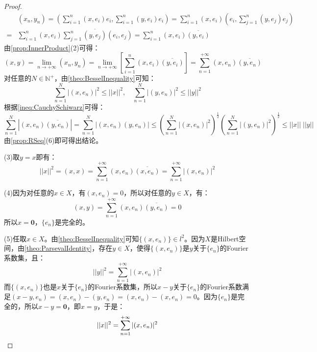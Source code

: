 \begin{proof}
	\begin{align*}
		&(x_n,y_n)=\left(\sum_{i=1}^{n}(x,e_i)e_i,\sum_{i=1}^{n}(y,e_i)e_i\right)=\sum_{i=1}^{n}(x,e_i)\left(e_i,\sum_{j=1}^{n}(y,e_j)e_j\right) \\
		=&\sum_{i=1}^{n}(x,e_i)\sum_{j=1}^{n}\overline{(y,e_j)}(e_i,e_j) =\sum_{i=1}^{n}(x,e_i)\overline{(y,e_i)}
	\end{align*}
	由\cref{prop:InnerProduct}(2)可得：
	\begin{equation*}
		(x,y)=\lim_{n\to+\infty}(x_n,y_n)=\lim_{n\to+\infty}\left[\sum_{i=1}^{n}(x,e_i)\overline{(y,e_i)}\right]=\sum_{n=1}^{+\infty}(x,e_n)\overline{(y,e_n)}
	\end{equation*}
	对任意的$N\in\mathbb{N}^+$，由\cref{theo:BesselInequality}可知：
	\begin{equation*}
		\sum_{n=1}^{N}|(x,e_n)|^2\leqslant||x||^2,\quad\sum_{n=1}^{N}|(y,e_n)|^2\leqslant||y||^2
	\end{equation*}
	根据\cref{ineq:CauchySchiwarz}可得：
	\begin{equation*}
		\sum_{n=1}^{N}|(x,e_n)\overline{(y,e_n)}|=\sum_{n=1}^{N}|(x,e_n)(y,e_n)|\leqslant\left(\sum_{n=1}^{N}|(x,e_n)|^2\right)^{\frac{1}{2}}\left(\sum_{n=1}^{N}|(y,e_n)|^2\right)^{\frac{1}{2}}\leqslant||x||\;||y||
	\end{equation*}
	由\cref{prop:RSeq}(6)即可得出结论。\par
	(3)取$y=x$即有：
	\begin{equation*}
		||x||^2=(x,x)=\sum_{n=1}^{+\infty}(x,e_n)\overline{(x,e_n)}=\sum_{n=1}^{+\infty}|(x,e_n)|^2
	\end{equation*}\par
	(4)因为对任意的$x\in X$，有$(x,e_n)=0$，所以对任意的$y\in X$，有：
	\begin{equation*}
		(x,y)=\sum_{n=1}^{+\infty}(x,e_n)\overline{(y,e_n)}=0
	\end{equation*}
	所以$x=\mathbf{0}$，$\{e_n\}$是完全的。\par
	(5)任取$x\in X$。由\cref{theo:BesselInequality}可知$\{(x,e_n)\}\in l^2$。因为$X$是Hilbert空间，由\cref{theo:ParsevalIdentity}，存在$y\in X$，使得$\{(x,e_n)\}$是$y$关于$\{e_n\}$的Fourier系数集，且：
	\begin{equation*}
		||y||^2=\sum_{n=1}^{+\infty}|(x,e_n)|^2
	\end{equation*}
	而$\{(x,e_n)\}$也是$x$关于$\{e_n\}$的Fourier系数集，所以$x-y$关于$\{e_n\}$的Fourier系数满足$(x-y,e_n)=(x,e_n)-(y,e_n)=(x,e_n)-(x,e_n)=0$。因为$\{e_n\}$是完全的，所以$x-y=\mathbf{0}$，即$x=y$，于是：
	\begin{equation*}
		||x||^2=\sum_{n=1}^{+\infty}|(x,e_n)|^2\qedhere
	\end{equation*}
\end{proof}
